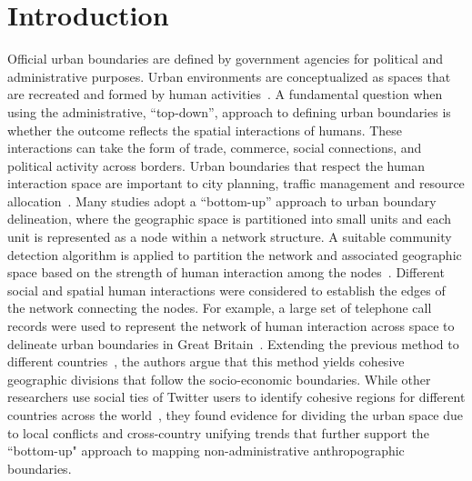 \documentclass[]{tGIS2e}
\begin{document}
\section{Introduction}
Official urban boundaries are defined by government agencies for political and administrative purposes.
Urban environments are conceptualized as spaces that are recreated and formed by human activities~\citep{schliephake}.
A fundamental question when using the administrative, ``top-down'', approach to defining urban boundaries is whether the outcome reflects the spatial interactions of humans.
These interactions can take the form of trade, commerce, social connections, and political activity across borders.
Urban boundaries that respect the human interaction space are important to city planning, traffic management and resource allocation~\citep{gao2014, jiang2015,liu2015,long2015}.
Many studies adopt a ``bottom-up'' approach to urban boundary delineation, where the geographic space is partitioned into small units and each unit is represented as a node within a network structure.
A suitable community detection algorithm is applied to partition the network and associated geographic space based on the strength of human interaction among the nodes~\citep{lancichinetti2009}.
Different social and spatial human interactions were considered to establish the edges of the network connecting the nodes.
For example, a large set of telephone call records were used to represent the network of human interaction across space to delineate urban boundaries in Great Britain~\citep{ratti2010}.
Extending the previous method to different countries~\citep{sobolevsky2013}, the authors argue that this method yields cohesive geographic divisions that follow the socio-economic boundaries.
While other researchers use social ties of Twitter users to identify cohesive regions for different countries across the world~\citep{kallus2015}, they found evidence for dividing the urban space due to local conflicts and cross-country unifying trends that further support the ``bottom-up" approach to mapping non-administrative anthropographic boundaries.
\end{document}
